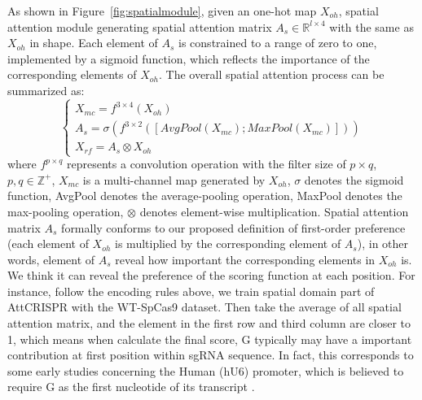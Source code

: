 \documentclass{bioinfo}
\begin{document}
As shown in Figure~\ref{fig:spatialmodule}, given an one-hot map $X_{oh}$, spatial attention module generating spatial attention matrix 
$A_s\in\mathbb{R}^{l\times 4}$ with the same as $X_{oh}$ in shape. 
Each element of $A_s$ is constrained to a range of zero to one, implemented by a sigmoid function, which reflects the importance of the corresponding elements of $X_{oh}$.
The overall spatial attention process can be summarized as:
\begin{equation}
\left\{\begin{array}{l}
X_{mc} = f^{3\times4}(X_{oh})
\\A_s = \sigma(f^{3\times2}([AvgPool(X_{mc});MaxPool(X_{mc})]))
\\X_{rf} = A_s\otimes X_{oh}
\end{array}\right.\label{eq:11}
\end{equation}
where $f^{p\times q}$ represents a convolution operation with the filter size of $p\times q$, 
$p,q\in\mathbb{Z}^{+}$, $X_{mc}$ is a multi-channel map generated by $X_{oh}$, $\sigma$ denotes the sigmoid function, 
AvgPool denotes the average-pooling operation, MaxPool denotes the max-pooling operation, $\otimes$ denotes element-wise multiplication.
Spatial attention matrix $A_s$ formally conforms to our proposed definition of first-order preference (each element of $X_{oh}$ is multiplied by the corresponding element of $A_s$), 
in other words, element of $A_s$ reveal how important the corresponding elements in $X_{oh}$ is. 
We think it can reveal the preference of the scoring function at each position. 
For instance, follow the encoding rules above, we train spatial domain part of AttCRISPR with the WT-SpCas9 dataset. 
Then take the average of all spatial attention matrix, and the element in the first row and third column are closer to 1, which means when calculate the final score, 
G typically may have a important contribution at first position within sgRNA sequence. 
In fact, this corresponds to some early studies concerning the Human (hU6) promoter, which is believed to require G as the first nucleotide of its transcript \citep{jinek2012a,cong2013multiplex,mali2013rnaguided}.
\end{document}
